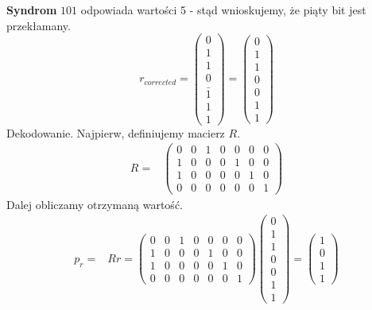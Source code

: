 \textbf{Syndrom} $101$ odpowiada wartości 5 - stąd wnioskujemy, że piąty bit jest przekłamany.
\[
    r_{corrected}=\begin{pmatrix}
                      0       \\
                      1       \\
                      1       \\
                      0       \\
                      \bar{1} \\
                      1       \\
                      1
    \end{pmatrix}=\begin{pmatrix}
                      0 \\
                      1 \\
                      1 \\
                      0 \\
                      0 \\
                      1 \\
                      1
    \end{pmatrix}
\]
Dekodowanie. Najpierw, definiujemy macierz $R$.
\begin{align*}
    R=&\begin{pmatrix}
           0 & 0 & 1 & 0 & 0 & 0 & 0 \\
           1 & 0 & 0 & 0 & 1 & 0 & 0 \\
           1 & 0 & 0 & 0 & 0 & 1 & 0 \\
           0 & 0 & 0 & 0 & 0 & 0 & 1
    \end{pmatrix}
\end{align*}
Dalej obliczamy otrzymaną wartość.
\begin{align*}
    p_r=&Rr=\begin{pmatrix}
                0 & 0 & 1 & 0 & 0 & 0 & 0 \\
                1 & 0 & 0 & 0 & 1 & 0 & 0 \\
                1 & 0 & 0 & 0 & 0 & 1 & 0 \\
                0 & 0 & 0 & 0 & 0 & 0 & 1
    \end{pmatrix}
    \begin{pmatrix}
        0 \\
        1 \\
        1 \\
        0 \\
        0 \\
        1 \\
        1
    \end{pmatrix}=
    \begin{pmatrix}
        1 \\
        0 \\
        1 \\
        1
    \end{pmatrix}
\end{align*}
